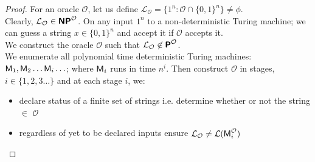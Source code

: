 \documentclass[usletter]{article}
\newcommand {\langset}[1]      {\ensuremath{\mathcal{#1}}}
\newcommand {\machine}[1]      {\ensuremath{\textnormal{\textsf{#1}}}}
\newcommand {\family}[1]       {\ensuremath{\textnormal{\textsf{\textbf{#1}}}}}
\begin{document}
\begin{proof}
For an oracle \langset{O}, let us define
$\langset{L}_\langset{O} = \{ 1^n : \langset{O} \cap \{0,1\}^n \} \neq \phi$. \\
Clearly, $\langset{L}_\langset{O} \in \family{NP}^\langset{O}$.
On any input $1^n$ to a non-deterministic Turing machine; we can guess a string
$x \in \{0,1\}^n$ and accept it if \langset{O} accepts it. \\

\noindent
We construct the oracle \langset{O} such that
$\langset{L}_\langset{O} \not\in \family{P}^\langset{O}$. \\
We enumerate all polynomial time deterministic Turing machines:
$\machine{M}_1, \machine{M}_2 \ldots \machine{M}_i \ldots$;
where $\machine{M}_i$ runs in time $n^i$. Then construct \langset{O} in stages,
$i \in \{1, 2, 3 \ldots\}$ and at each stage $i$, we:
\begin{itemize}
  \item declare status of a finite set of strings
    i.e. determine whether or not the string $\in$ \langset{O}
  \item regardless of yet to be declared inputs ensure
    $\langset{L}_\langset{O} \neq \langset{L}(\machine{M}_i^\langset{O})$
\end{itemize}


\end{proof}
\end{document}
